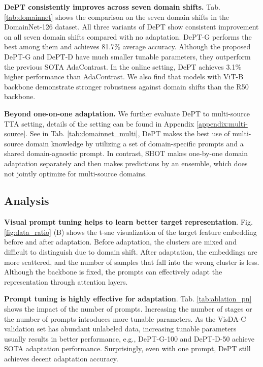 \documentclass{article} \usepackage{iclr2023_conference,times}
\begin{document}
\textbf{DePT consistently improves across seven domain shifts.}
Tab. \ref{tab:domainnet} shows the comparison on the seven domain shifts in the DomainNet-126 dataset. All three variants of DePT show consistent improvement on all seven domain shifts compared with no adaptation. DePT-G performs the best among them and achieves 81.7\% average accuracy. Although the proposed DePT-G and DePT-D have much smaller tunable parameters, they outperform the previous SOTA AdaContrast. In the online setting, DePT achieves 3.1\% higher performance than AdaContrast. We also find that models with ViT-B backbone demonstrate stronger robustness against domain shifts than the R50 backbone. 

\textbf{Beyond one-on-one adaptation.}
We further evaluate DePT to multi-source TTA setting, details of the setting can be found in Appendix \ref{appendix:multi-source}. See in Tab. \ref{tab:domainnet_multi}, DePT makes the best use of multi-source domain knowledge by utilizing a set of domain-specific prompts and a shared domain-agnostic prompt. In contrast, SHOT \citep{liang2020we} makes one-by-one domain adaptation separately and then makes predictions by an ensemble, which does not jointly optimize for multi-source domains.







\subsection{Analysis}

\textbf{Visual prompt tuning helps to learn better target representation}. Fig. \ref{fig:data_ratio} (B) shows the t-sne visualization of the target feature embedding before and after adaptation. Before adaptation, the clusters are mixed and difficult to distinguish due to domain shift. After adaptation, the embeddings are more scattered, and the number of samples that fall into the wrong cluster is less. Although the backbone is fixed, the prompts can effectively adapt the representation through attention layers.


\textbf{Prompt tuning is highly effective for adaptation}. Tab. \ref{tab:ablation_pn} shows the impact of the number of prompts. Increasing the number of stages or the number of prompts introduces more tunable parameters. As the VisDA-C validation set has abundant unlabeled data, increasing tunable parameters usually results in better performance, e.g., DePT-G-100 and DePT-D-50 achieve SOTA adaptation performance. Surprisingly, even with one prompt, DePT still achieves decent adaptation accuracy.
\end{document}
